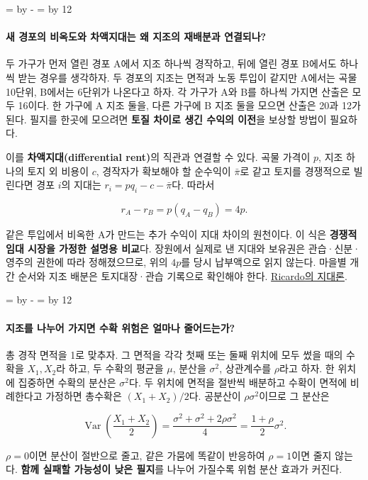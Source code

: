 \documentclass[10pt,a4paper]{article}
\newcommand{\ReserveQuestionSpace}{%
  \par\begingroup
  \dimen0=\pagegoal \advance\dimen0 by -\pagetotal
  \dimen2=\baselineskip \multiply\dimen2 by 12
  \ifdim\dimen0<\dimen2 \newpage\fi
  \endgroup}
\begin{document}
\ReserveQuestionSpace
\paragraph{새 경포의 비옥도와 차액지대는 왜 지조의 재배분과 연결되나?}
두 가구가 먼저 열린 경포 A에서 지조 하나씩 경작하고, 뒤에 열린 경포 B에서도 하나씩 받는 경우를 생각하자. 두 경포의 지조는 면적과 노동 투입이 같지만 A에서는 곡물 10단위, B에서는 6단위가 나온다고 하자. 각 가구가 A와 B를 하나씩 가지면 산출은 모두 16이다. 한 가구에 A 지조 둘을, 다른 가구에 B 지조 둘을 모으면 산출은 20과 12가 된다. 필지를 한곳에 모으려면 \textbf{토질 차이로 생긴 수익의 이전}을 보상할 방법이 필요하다.\par

이를 \textbf{차액지대(differential rent)}의 직관과 연결할 수 있다. 곡물 가격이 $p$, 지조 하나의 토지 외 비용이 $c$, 경작자가 확보해야 할 순수익이 $\bar\pi$로 같고 토지를 경쟁적으로 빌린다면 경포 $i$의 지대는 $r_i=pq_i-c-\bar\pi$다. 따라서\par

\[
r_A-r_B=p(q_A-q_B)=4p.
\]

같은 투입에서 비옥한 A가 만드는 추가 수익이 지대 차이의 원천이다. 이 식은 \textbf{경쟁적 임대 시장을 가정한 설명용 비교}다. 장원에서 실제로 낸 지대와 보유권은 관습·신분·영주의 권한에 따라 정해졌으므로, 위의 $4p$를 당시 납부액으로 읽지 않는다. 마을별 개간 순서와 지조 배분은 토지대장·관습 기록으로 확인해야 한다. \href{https://www.econlib.org/library/Ricardo/ricP.html?chapter\_num=3}{Ricardo의 지대론}.\par

\ReserveQuestionSpace
\paragraph{지조를 나누어 가지면 수확 위험은 얼마나 줄어드는가?}
총 경작 면적을 1로 맞추자. 그 면적을 각각 첫째 또는 둘째 위치에 모두 썼을 때의 수확을 $X_1,X_2$라 하고, 두 수확의 평균을 $\mu$, 분산을 $\sigma^2$, 상관계수를 $\rho$라고 하자. 한 위치에 집중하면 수확의 분산은 $\sigma^2$다. 두 위치에 면적을 절반씩 배분하고 수확이 면적에 비례한다고 가정하면 총수확은 $(X_1+X_2)/2$다. 공분산이 $\rho\sigma^2$이므로 그 분산은\par

\[
\operatorname{Var}\!\left(\frac{X_1+X_2}{2}\right)
=\frac{\sigma^2+\sigma^2+2\rho\sigma^2}{4}
=\frac{1+\rho}{2}\sigma^2.
\]

$\rho=0$이면 분산이 절반으로 줄고, 같은 가뭄에 똑같이 반응하여 $\rho=1$이면 줄지 않는다. \textbf{함께 실패할 가능성이 낮은 필지}를 나누어 가질수록 위험 분산 효과가 커진다.\par
\end{document}
